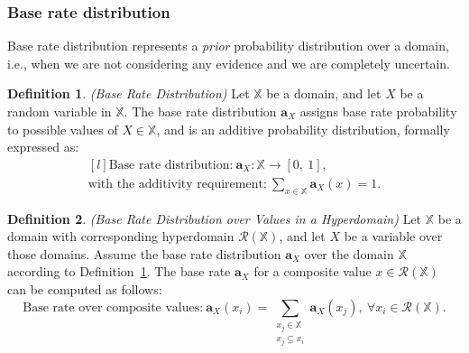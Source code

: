 \documentclass[a4paper,12pt]{article}
\theoremstyle{definition}
\newtheorem{definition}{Definition}[section]
\numberwithin{equation}{section}
\begin{document}
\subsubsection{Base rate distribution}

Base rate distribution represents a \emph{prior} probability distribution over a domain, i.e., when we are not considering any evidence and we are completely uncertain.

\begin{definition}\label{def:base_rate_distribution}
	\emph{(Base Rate Distribution)} Let $\mathbb{X}$ be a domain, and let $X$ be a random variable in $\mathbb{X}$. The base rate distribution $\mathbf{a}_X$ assigns base rate probability to possible values of $X \in \mathbb{X}$, and is an additive probability distribution, formally expressed as:
	\begin{equation}\label{eq:base_rate_distribution}
		\begin{matrix*}[l]
			\text{Base rate distribution:}\ \mathbf{a}_X : \mathbb{X} \rightarrow [0,\ 1], \\
			\text{with the additivity requirement:}\ \sum\limits_{x \in \mathbb{X}} \mathbf{a}_X(x) = 1\text{.}
		\end{matrix*}
	\end{equation}
\end{definition}

\begin{definition}\label{def:base_rate_distribution_over_values_in_a_hyperdomain}
	\emph{(Base Rate Distribution over Values in a Hyperdomain)} Let $\mathbb{X}$ be a domain with corresponding hyperdomain $\mathcal{R}(\mathbb{X})$, and let $X$ be a variable over those domains. Assume the base rate distribution $\mathbf{a}_X$ over the domain $\mathbb{X}$ according to Definition~\ref{def:base_rate_distribution}. The base rate $\mathbf{a}_X$ for a composite value $x \in \mathcal{R}(\mathbb{X})$ can be computed as follows:
	\begin{equation}
		\text{Base rate over composite values:}\ \mathbf{a}_X(x_i) = \sum\limits_{\substack{x_j \in \mathbb{X} \\ x_j \subseteq x_i}} \mathbf{a}_X(x_j),\ \forall x_i \in \mathcal{R}(\mathbb{X})\text{.}
	\end{equation}
\end{definition}
\end{document}
